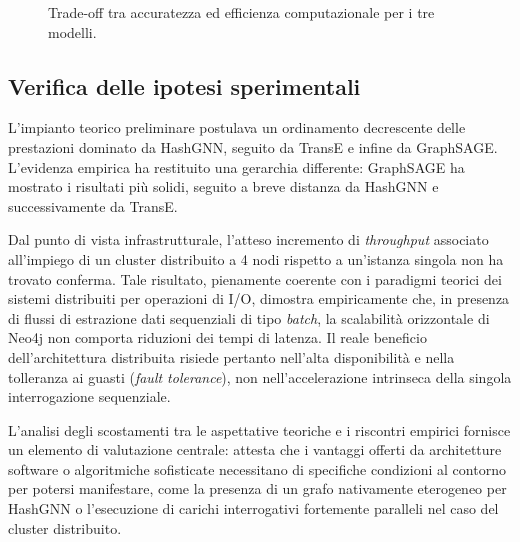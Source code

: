 \begin{figure}[ht!]
\centering
{}
\caption{Trade-off tra accuratezza ed efficienza computazionale per i tre modelli.}
\label{fig:tradeoff}
\end{figure}



\subsection{Verifica delle ipotesi sperimentali}

L'impianto teorico preliminare postulava un ordinamento decrescente delle prestazioni dominato da HashGNN, seguito da TransE e infine da GraphSAGE. L'evidenza empirica ha restituito una gerarchia differente: GraphSAGE ha mostrato i risultati più solidi, seguito a breve distanza da HashGNN e successivamente da TransE.

Dal punto di vista infrastrutturale, l'atteso incremento di \textit{throughput} associato all'impiego di un cluster distribuito a 4 nodi rispetto a un'istanza singola non ha trovato conferma. Tale risultato, pienamente coerente con i paradigmi teorici dei sistemi distribuiti per operazioni di I/O, dimostra empiricamente che, in presenza di flussi di estrazione dati sequenziali di tipo \textit{batch}, la scalabilità orizzontale di Neo4j non comporta riduzioni dei tempi di latenza. Il reale beneficio dell'architettura distribuita risiede pertanto nell'alta disponibilità e nella tolleranza ai guasti (\textit{fault tolerance}), non nell'accelerazione intrinseca della singola interrogazione sequenziale.

L'analisi degli scostamenti tra le aspettative teoriche e i riscontri empirici fornisce un elemento di valutazione centrale: attesta che i vantaggi offerti da architetture software o algoritmiche sofisticate necessitano di specifiche condizioni al contorno per potersi manifestare, come la presenza di un grafo nativamente eterogeneo per HashGNN o l'esecuzione di carichi interrogativi fortemente paralleli nel caso del cluster distribuito.